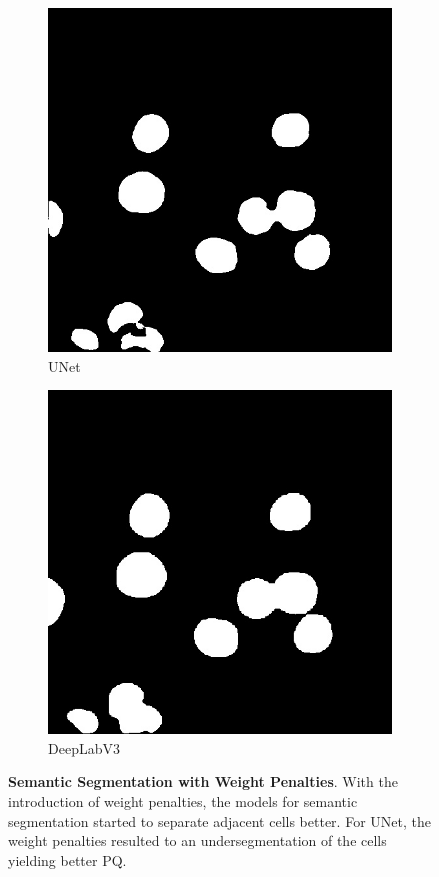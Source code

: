 \documentclass[10pt, journal, compsoc]{IEEEtran}
\begin{document}
\begin{figure}
\begin{subfigure}[b]{0.49\linewidth}
\end{subfigure}
\begin{subfigure}[b]{0.49\linewidth}
\includegraphics[width=\linewidth]{c127/unet-weighted/108641.jpg}
\caption*{UNet}
\end{subfigure}
\begin{subfigure}[b]{0.49\linewidth}
\includegraphics[width=\linewidth]{c127/deeplab-weighted/108641.jpg}
\caption*{DeepLabV3}
\end{subfigure}
\caption{\textbf{Semantic Segmentation with Weight Penalties}. With the introduction of weight penalties, the models for semantic segmentation started to separate adjacent cells better. For UNet, the weight penalties resulted to an undersegmentation of the cells yielding better PQ.}
\label{fig:segmentation_with_weight_map}
\end{figure}
\end{document}
